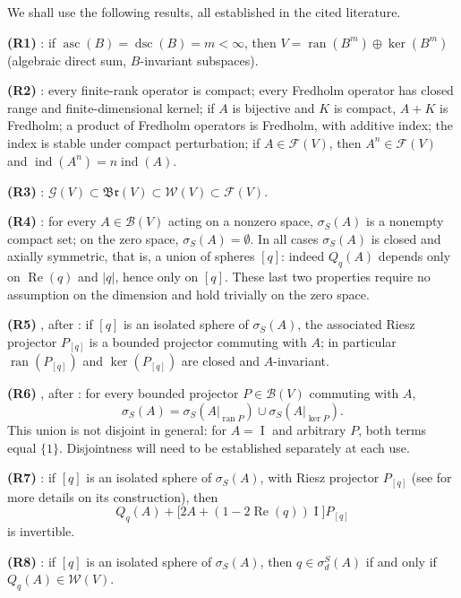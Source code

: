 \documentclass[11pt,a4paper]{article}
\theoremstyle{plain}
\theoremstyle{remark}
\newcommand{\V}{V}
\newcommand{\B}{\mathcal B}
\newcommand{\F}{\mathcal F}
\newcommand{\W}{\mathcal W}
\newcommand{\G}{\mathcal G}
\newcommand{\Br}{\mathfrak{Br}}
\newcommand{\sS}{\sigma_S}
\newcommand{\sd}{\sigma_d^S}
\DeclareMathOperator{\ran}{ran}
\DeclareMathOperator{\asc}{asc}
\DeclareMathOperator{\dsc}{dsc}
\DeclareMathOperator{\ind}{ind}
\DeclareMathOperator{\Id}{I}
\newcommand{\Qq}[1]{Q_q(#1)}
\begin{document}
We shall use the following results, all established in the cited literature.

\medskip
\noindent\textbf{(R1)} \cite[Lemma~7.7]{MT19}: if $\asc(B)=\dsc(B)=m<\infty$, then $\V=\ran(B^m)\oplus\ker(B^m)$ (algebraic direct sum, $B$-invariant subspaces).

\medskip
\noindent\textbf{(R2)} \cite[Prop.~3.6, 4.2, Thm~4.5, 4.9, 4.11, Cor.~4.13]{MT19}: every finite-rank operator is compact; every Fredholm operator has closed range and finite-dimensional kernel; if $A$ is bijective and $K$ is compact, $A+K$ is Fredholm; a product of Fredholm operators is Fredholm, with additive index; the index is stable under compact perturbation; if $A\in\F(\V)$, then $A^n\in\F(\V)$ and $\ind(A^n)=n\ind(A)$.

\medskip
\noindent\textbf{(R3)} \cite[Rem.~7.9]{MT19}: $\G(\V)\subset\Br(\V)\subset\W(\V)\subset\F(\V)$.

\medskip
\noindent\textbf{(R4)} \cite[Prop.~3.16]{MT19}: for every $A\in\B(\V)$ acting on a nonzero space, $\sS(A)$ is a nonempty compact set; on the zero space, $\sS(A)=\emptyset$. In all cases $\sS(A)$ is closed and axially symmetric, that is, a union of spheres $[q]$: indeed $\Qq{A}$ depends only on $\operatorname{Re}(q)$ and $|q|$, hence only on $[q]$. These last two properties require no assumption on the dimension and hold trivially on the zero space.

\medskip
\noindent\textbf{(R5)} \cite[Thm~2.12]{BJZ24}, after \cite[Thm~4.1.5]{CGK}: if $[q]$ is an isolated sphere of $\sS(A)$, the associated Riesz projector $P_{[q]}$ is a bounded projector commuting with $A$; in particular $\ran(P_{[q]})$ and $\ker(P_{[q]})$ are closed and $A$-invariant.

\medskip
\noindent\textbf{(R6)} \cite[Thm~3.3]{BJZ24}, after \cite[Thm~4.4]{ACS14}: for every bounded projector $P\in\B(\V)$ commuting with $A$,
\[
\sS(A)=\sS(A|_{\ran P})\cup\sS(A|_{\ker P}).
\]
This union is not disjoint in general: for $A=\Id$ and arbitrary $P$, both terms equal $\{1\}$. Disjointness will need to be established separately at each use.

\medskip
\noindent\textbf{(R7)} \cite[Prop.~3.7]{BJZ24}: if $[q]$ is an isolated sphere of $\sS(A)$, with Riesz projector $P_{[q]}$ (see \cite{CGK,CSS11} for more details on its construction), then
\[
\Qq{A}+\big[2A+(1-2\operatorname{Re}(q))\Id\big]P_{[q]}
\]
is invertible.

\medskip
\noindent\textbf{(R8)} \cite[Prop.~3.8]{BJZ24}: if $[q]$ is an isolated sphere of $\sS(A)$, then $q\in\sd(A)$ if and only if $\Qq{A}\in\W(\V)$.
\end{document}
